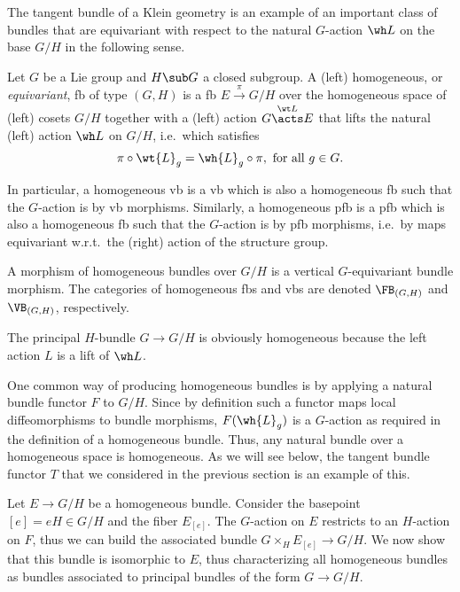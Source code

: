 The tangent bundle of a Klein geometry is an example of an important class of bundles that are equivariant with respect to the natural $G$-action $\wh L$ on the base $G\slash H$ in the following sense.


\begin{defn}
    Let $G$ be a Lie group and $H\sub G$ a closed subgroup. A (left) homogeneous, or \emph{equivariant}, \gls{fb} of type $(G,H)$ is a \gls{fb} $E\overset{\pi}{\to}G\slash H$ over the homogeneous space of (left) cosets $G\slash H$ together with a (left) action $G\overset{\wt L}{\acts} E$ that lifts the natural (left) action $\wh L$ on $G\slash H$, i.e.\ which satisfies \[\pi\circ \wt{L}_g=\wh{L}_g\circ \pi,\text{ for all } g\in G.\] 

    In particular, a homogeneous \gls{vb} is a \gls{vb} which is also a homogeneous \gls{fb} such that the $G$-action is by \gls{vb} morphisms. Similarly, a homogeneous \gls{pfb} is a \gls{pfb} which is also a homogeneous \gls{fb} such that the $G$-action is by \gls{pfb} morphisms, i.e.\ by maps equivariant w.r.t.\ the (right) action of the structure group.

    A morphism of homogeneous bundles over $G\slash H$ is a vertical $G$-equivariant bundle morphism. The categories of homogeneous \glspl{fb} and \glspl{vb} are denoted $\FB_{(G,H)}$ and $\VB_{(G,H)}$, respectively. 
\end{defn}

\begin{example}
    The principal $H$-bundle $G\to G\slash H$ is obviously homogeneous because the left action $L$ is a lift of $\wh L$.
\end{example}

One common way of producing homogeneous bundles is by applying a natural bundle functor $F$ to $G\slash H$. Since by definition such a functor maps local diffeomorphisms to bundle morphisms, $F(\wh{L}_g)$ is a $G$-action as required in the definition of a homogeneous bundle. Thus, any natural bundle over a homogeneous space is homogeneous. As we will see below, the tangent bundle functor $T$ that we considered in the previous section is an example of this.

Let $E\to G\slash H$ be a homogeneous bundle. Consider the basepoint $[e]=eH\in G\slash H$ and the fiber $E_{[e]}$. The $G$-action on $E$ restricts to an $H$-action on $F$, thus we can build the associated bundle $G\times_H E_{[e]}\to G\slash H$. We now show that this bundle is isomorphic to $E$, thus characterizing all homogeneous bundles as bundles associated to principal bundles of the form $G\to G\slash H$.

